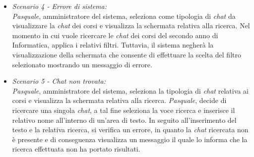 \begin{itemize}
	\item \textit{Scenario 4 - Errore di sistema:\\}
	\textit{Pasquale}, amministratore del sistema, seleziona come tipologia di \textit{chat} da visualizzare la \textit{chat} dei corsi e visualizza la schermata relativa alla ricerca. Nel momento in cui vuole ricercare le \textit{chat} dei corsi del secondo anno di Informatica, applica i relativi filtri. 
	Tuttavia, il sistema negherà la visualizzazione della schermata che consente di effettuare la scelta del filtro selezionato mostrando un messaggio di errore.\\
	
	\item \textit{Scenario 5 - Chat non trovata:\\}
	\textit{Pasquale}, amministratore del sistema, seleziona la tipologia di \textit{chat} relativa ai corsi e visualizza la schermata relativa alla ricerca. \textit{Pasquale}, decide di ricercare una singola \textit{chat}, a tal fine seleziona la voce ricerca e inserisce il relativo nome all’interno di un’area di testo. In seguito all’inserimento del testo e la relativa ricerca, si verifica un errore, in quanto la \textit{chat} ricercata non è presente e di conseguenza visualizza un messaggio il quale lo informa che la ricerca effettuata non ha portato risultati.\\
\end{itemize}

